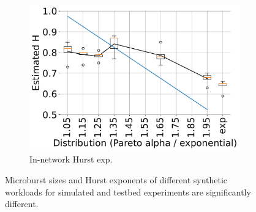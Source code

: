 \begin{figure}[t]
\begin{subfigure}[t]{0.32\linewidth}
    	\includegraphics[width=1\linewidth]{figs/filehurst_testbed.pdf}
    \caption{In-network Hurst exp.}
	\label{fig:filehurst-testbed}
\end{subfigure}
    \caption{\small{Microburst sizes and Hurst exponents of different synthetic workloads for simulated and testbed experiments are significantly different. 
    }}
	\label{fig:filesize}
\end{figure}

